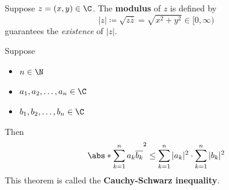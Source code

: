 \bigskip

\begin{definition} \label{an:def:modulus}
  Suppose $z = (x, y) \in \C$. The \textbf{modulus} of $z$ is defined by
  \[
    |z| \coloneqq \sqrt{z\overline{z}} = \sqrt{x^{2} + y^{2}} \in [0, \infty)
  \]
   guarantees the \emph{existence} of $|z|$.
\end{definition}

\bigskip

\begin{theorem} \label{an:thm:cauchy-schwarz-inequality}
  Suppose
  \begin{itemize}
    \item $n \in \N$
    \item $a_{1}, a_{2}, \ldots, a_{n} \in \C$
    \item $b_{1}, b_{2}, \ldots, b_{n} \in \C$
  \end{itemize}
  Then
  \[
    \abs*{\sum_{k = 1}^{n} a_{k} \overline{b_{k}}}^{2}
    \leq \sum_{k = 1}^{n} |a_{k}|^{2} \cdot \sum_{k = 1}^{n} |b_{k}|^{2}
  \]
  This theorem is called the \textbf{Cauchy-Schwarz inequality}.
\end{theorem}

